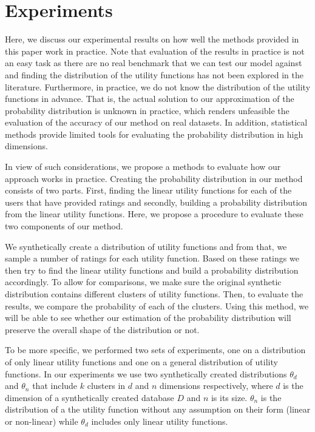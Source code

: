 \section{Experiments}
Here, we discuss our experimental results on how well the methods provided in this paper work in practice. Note that evaluation of the results in practice is not an easy task as there are no real benchmark that we can test our model against and finding the distribution of the utility functions has not been explored in the literature. Furthermore, in practice, we do not know the distribution of the utility functions in advance. That is, the actual solution to our approximation of the probability distribution is unknown in practice, which renders unfeasible the evaluation of the accuracy of our method on real datasets. In addition, statistical methods provide limited tools for evaluating the probability distribution in high dimensions. 

In view of such considerations, we propose a methods to evaluate how our approach works in practice. Creating the probability distribution in our method consists of two parts. First, finding the linear utility functions for each of the users that have provided ratings and secondly, building a probability distribution from the linear utility functions. Here, we propose a procedure to evaluate these two components of our method.

We synthetically create a distribution of utility functions and from that, we sample a number of ratings for each utility function. Based on these ratings we then try to find the linear utility functions and build a probability distribution accordingly. To allow for comparisons, we make sure the original synthetic distribution contains different clusters of utility functions. Then, to evaluate the results, we compare the probability of each of the clusters. Using this method, we will be able to see whether our estimation of the probability distribution will preserve the overall shape of the distribution or not.

To be more specific, we performed two sets of experiments, one on a distribution of only linear utility functions and one on a general distribution of utility functions.  In our experiments we use two synthetically created distributions $\theta_d$ and $\theta_n$ that include $k$ clusters in $d$ and $n$ dimensions respectively, where $d$ is the dimension of a synthetically created database $D$ and $n$ is its size. $\theta_n$ is the distribution of a the utility function without any assumption on their form (linear or non-linear) while $\theta_d$ includes only linear utility functions. 

